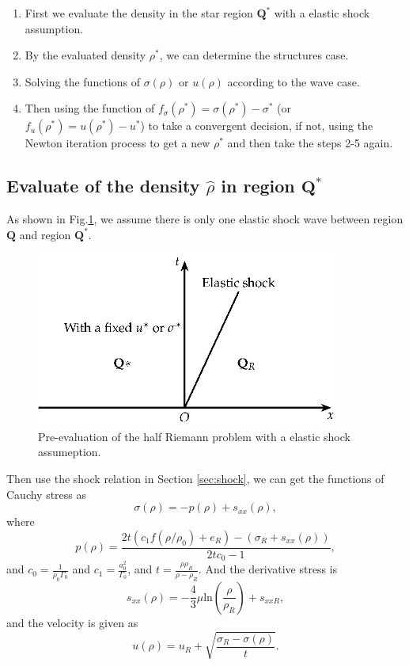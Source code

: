 \documentclass[review]{elsarticle}
\begin{document}
\begin{enumerate}
\item First we  evaluate the density in the star region $\mathbf{Q}^*$ with a  elastic shock assumption. 
\item By the evaluated density $\rho^*$, we can determine the structures case.
\item Solving the functions of $\sigma(\rho)$ or $u(\rho)$ according to the wave case.
  \item 
	Then using the function of $f_\sigma(\rho^*) = \sigma(\rho^*) - \sigma^*$ (or  $f_u(\rho^*)=u(\rho^*) - u^*$) to take a  convergent decision, if not,  using   the  Newton iteration process to get a new $\rho^*$ and then take the steps 2-5 again. 
  \end{enumerate}
\subsection{Evaluate of the density $\hat{\rho}$ in region $\mathbf{Q}^*$ }
As shown in Fig.\ref{fig:half:shock}, we  assume there is only one elastic shock wave between region $\mathbf{Q}$ and region $\mathbf{Q}^*$.

\begin{figure}
  \centering
  \includegraphics[width= 10cm] {Tikz-figure9.eps}
  \caption{Pre-evaluation of the half Riemann problem  with a elastic shock assumeption.}
  \label{fig:half:shock}
\end{figure}
Then use the shock relation in Section \ref{sec:shock}, we can get the functions of Cauchy stress as 
\begin{equation}
  \sigma(\rho) = -p(\rho) +s_{xx}(\rho),
\end{equation}
where 
\begin{equation}
  p(\rho)= \frac{2t(c_1f(\rho/\rho_0)+e_R)-(\sigma_R+s_{xx}(\rho))}{2tc_0-1},
\end{equation}
and $c_0 = \frac{1}{\rho_0\Gamma_0}$ and $c_1 = \frac{a_0^2}{\Gamma_0}$, and  $ t=\frac{\rho\rho_R}{\rho-\rho_R}$. And the derivative stress is 
\begin{equation}
  s_{xx}(\rho) = 
	   -\frac{4}{3}\mu\text{ln}\left(\frac{\rho}{\rho_{R}}\right)+s_{xxR},
 \end{equation}
 and the velocity is given as
 \begin{equation}
   u(\rho) = u_R+ \sqrt{\frac{\sigma_R- \sigma(\rho)}{t}}.
 \end{equation}
\end{document}
